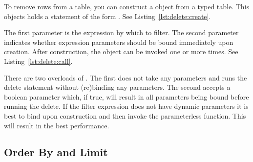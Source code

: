 To remove rows from a table, you can construct a  object from a typed table. This objects holds a statement of the form \newline {}. See Listing~\ref{lst:delete:create}.



The first parameter is the expression by which to filter. The second parameter indicates whether expression parameters should be bound immediately upon creation. After construction, the object can be invoked one or more times. See Listing~\ref{lst:delete:call}.



There are two overloads of . The first does not take any parameters and runs the delete statement without (re)binding any parameters. The second accepts a boolean parameter which, if true, will result in all parameters being bound before running the delete. If the filter expression does not have dynamic parameters it is best to bind upon construction and then invoke the parameterless function. This will result in the best performance.

\subsection{Order By and Limit}


